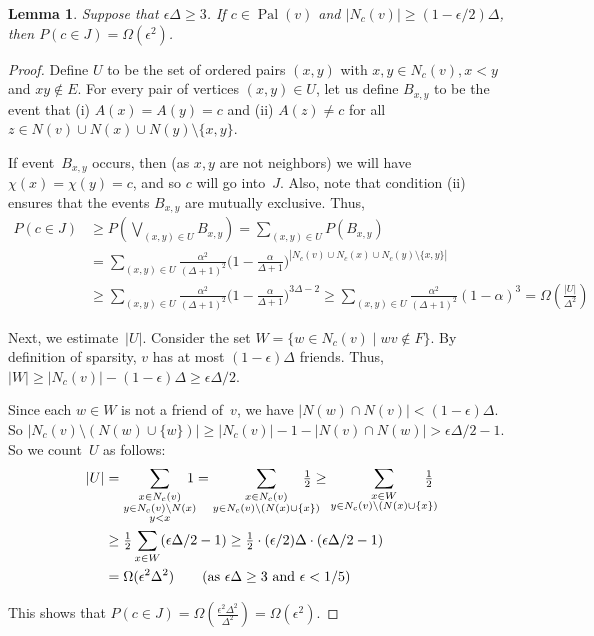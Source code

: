 \documentclass[11pt]{amsart}
\newtheorem{lemma}[theorem]{Lemma}
\newcommand{\pal}{\operatorname{Pal}}
\begin{document}
\begin{lemma}
\label{sparse-prop3}
Suppose that $\epsilon \Delta \geq 3$. If $c \in \pal(v)$ and $|N_c(v)| \geq (1 - \epsilon/2) \Delta$, then $P( c \in J ) = \Omega(\epsilon^2)$.
\end{lemma}
\begin{proof}
Define $U$ to be the set of ordered pairs $(x,y)$ with $x, y \in N_c(v), x < y$ and $xy \notin E$. For every pair of vertices $(x,y) \in U$, let us define $B_{x,y}$ to be the event that (i) $A(x) = A(y) = c$ and (ii) $A(z) \neq c$ for all $z \in N(v) \cup N(x) \cup N(y) \setminus \{x, y\}$. 

If event~$B_{x,y}$ occurs, then (as $x,y$ are not neighbors) we will have $\chi(x) = \chi(y) = c$, and so $c$ will go into~$J$. Also, note that condition (ii) ensures that the events $B_{x,y}$ are mutually exclusive. Thus,
\begin{align*}
P( c \in J) &\geq P( \bigvee_{(x,y) \in U} B_{x,y}) = \sum_{(x,y) \in U} P(B_{x,y}) \\
&= \sum_{(x,y) \in U} \frac{\alpha^2}{(\Delta+1)^2} \bigl( 1 - \frac{\alpha}{\Delta+1} \bigr)^{|N_c(v) \cup N_c(x) \cup N_c(y) \setminus \{x,y \} |} \\
&\geq \sum_{(x,y) \in U} \frac{\alpha^2}{(\Delta+1)^2} \bigl( 1 - \frac{\alpha}{\Delta+1} \bigr)^{3 \Delta - 2} \geq \sum_{(x,y) \in U} \frac{\alpha^2}{(\Delta+1)^2} (1 - \alpha)^3 = \Omega(\frac{|U|}{\Delta^2})
\end{align*}

Next, we estimate~$|U|$. Consider the set $W = \{w \in N_c(v) \mid wv \notin F \}$. By definition of sparsity, $v$ has at most $(1 - \epsilon) \Delta$ friends. Thus, $|W| \geq |N_c(v)| - (1 - \epsilon) \Delta \geq \epsilon \Delta/2$.

Since each $w \in W$ is not a friend of~$v$, we have $|N(w) \cap N(v)| < (1 - \epsilon) \Delta$.  So $|N_c(v) \setminus ( N(w) \cup \{w \})| \geq |N_c(v)| - 1 - |N(v) \cap N(w)| > \epsilon \Delta/2 - 1$. So we count~$U$ as follows:
\begin{align*}
|U| &= \sum_{\substack{x \in N_c(v) \\ y \in N_c(v) \setminus N(x) \\ y < x}} \negthickspace \negthickspace \negthickspace 1 
= \sum_{\substack{x \in N_c(v) \\ y \in N_c(v) \setminus (N(x) \cup \{ x \})}} \negthickspace \negthickspace \negthickspace \negthickspace \negthickspace \tfrac{1}{2} 
\geq \sum_{\substack{x \in W \\ y \in N_c(v) \setminus (N(x) \cup \{x \})}} \negthickspace \negthickspace  \negthickspace \negthickspace \tfrac{1}{2} \\
&\geq \tfrac{1}{2} \sum_{x \in W} ( \epsilon \Delta/2 - 1 ) \geq \tfrac{1}{2} \cdot (\epsilon/2) \Delta \cdot (\epsilon \Delta/2 - 1) \\
&= \Omega(\epsilon^2 \Delta^2) \qquad \text{(as $\epsilon \Delta \geq 3$ and $\epsilon < 1/5$)}
\end{align*}

This shows that $P(c \in J) = \Omega(\frac{\epsilon^2 \Delta^2}{\Delta^2}) = \Omega(\epsilon^2)$.
\end{proof}
\end{document}
